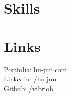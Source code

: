 \documentclass[]{junhu_resume}
\begin{document}
\begin{minipage}[t]{0.3\textwidth}
\section{Skills}
{}
\location{Graph DB  \textbullet{} Elasticsearch
}
\sectionsep



\section{Links} 
Portfolio: \href{http://www.hu-jun.com}{hu-jun.com}\\
Linkedin: \href{https://www.linkedin.com/in/jun-hu-664639a2/}{/hu-jun} \\
Github: \href{https://github.com/vibrioh}{/vibrioh}\\



\end{minipage}
\end{document}
